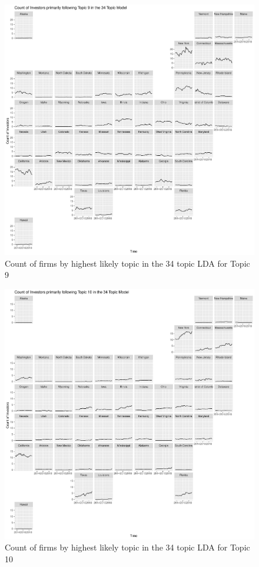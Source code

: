 		\begin{figure}
		\centering
		\includegraphics[width=1\linewidth]{Figures/ChapterV/USA_34_Topic09.pdf}
		\caption[Count of firm for Topic 9 by quarter]{Count of firms by highest likely topic in the 34 topic LDA for Topic 9}
		\label{fig:StateLDA9}
	\end{figure}
	
		\begin{figure}
		\centering
		\includegraphics[width=1\linewidth]{Figures/ChapterV/USA_34_Topic10.pdf}
		\caption[Count of firm for Topic 10 by quarter]{Count of firms by highest likely topic in the 34 topic LDA for Topic 10}
		\label{fig:StateLDA10}
	\end{figure}
	
